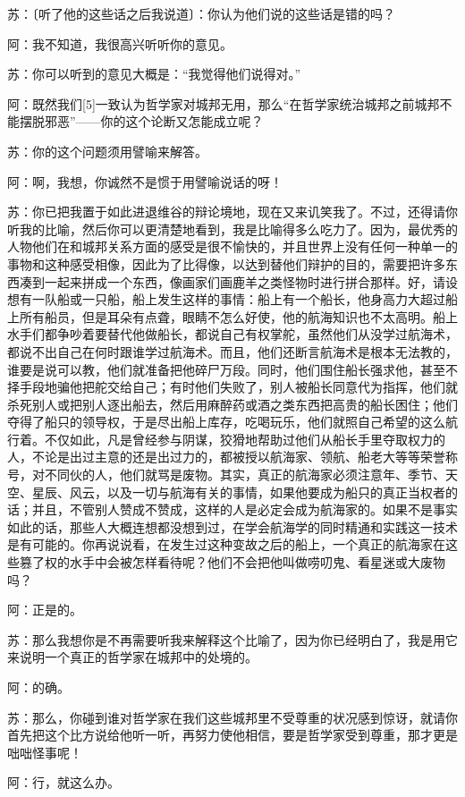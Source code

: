 \documentclass[12pt,oneside]{book}
\begin{document}
苏：〔听了他的这些话之后我说道〕：你认为他们说的这些话是错的吗？

阿：我不知道，我很高兴听听你的意见。

苏：你可以听到的意见大概是：“我觉得他们说得对。”

阿：既然我们[5]一致认为哲学家对城邦无用，那么“在哲学家统治城邦之前城邦不能摆脱邪恶”——你的这个论断又怎能成立呢？

苏：你的这个问题须用譬喻来解答。

阿：啊，我想，你诚然不是惯于用譬喻说话的呀！

苏：你已把我置于如此进退维谷的辩论境地，现在又来讥笑我了。不过，还得请你听我的比喻，然后你可以更清楚地看到，我是比喻得多么吃力了。因为，最优秀的人物他们在和城邦关系方面的感受是很不愉快的，并且世界上没有任何一种单一的事物和这种感受相像，因此为了比得像，以达到替他们辩护的目的，需要把许多东西凑到一起来拼成一个东西，像画家们画鹿羊之类怪物时进行拼合那样。好，请设想有一队船或一只船，船上发生这样的事情：船上有一个船长，他身高力大超过船上所有船员，但是耳朵有点聋，眼睛不怎么好使，他的航海知识也不太高明。船上水手们都争吵着要替代他做船长，都说自己有权掌舵，虽然他们从没学过航海术，都说不出自己在何时跟谁学过航海术。而且，他们还断言航海术是根本无法教的，谁要是说可以教，他们就准备把他碎尸万段。同时，他们围住船长强求他，甚至不择手段地骗他把舵交给自己；有时他们失败了，别人被船长同意代为指挥，他们就杀死别人或把别人逐出船去，然后用麻醉药或酒之类东西把高贵的船长困住；他们夺得了船只的领导权，于是尽出船上库存，吃喝玩乐，他们就照自己希望的这么航行着。不仅如此，凡是曾经参与阴谋，狡猾地帮助过他们从船长手里夺取权力的人，不论是出过主意的还是出过力的，都被授以航海家、领航、船老大等等荣誉称号，对不同伙的人，他们就骂是废物。其实，真正的航海家必须注意年、季节、天空、星辰、风云，以及一切与航海有关的事情，如果他要成为船只的真正当权者的话；并且，不管别人赞成不赞成，这样的人是必定会成为航海家的。如果不是事实如此的话，那些人大概连想都没想到过，在学会航海学的同时精通和实践这一技术是有可能的。你再说说看，在发生过这种变故之后的船上，一个真正的航海家在这些篡了权的水手中会被怎样看待呢？他们不会把他叫做唠叨鬼、看星迷或大废物吗？

阿：正是的。

苏：那么我想你是不再需要听我来解释这个比喻了，因为你已经明白了，我是用它来说明一个真正的哲学家在城邦中的处境的。

阿：的确。

苏：那么，你碰到谁对哲学家在我们这些城邦里不受尊重的状况感到惊讶，就请你首先把这个比方说给他听一听，再努力使他相信，要是哲学家受到尊重，那才更是咄咄怪事呢！

阿：行，就这么办。
\end{document}
